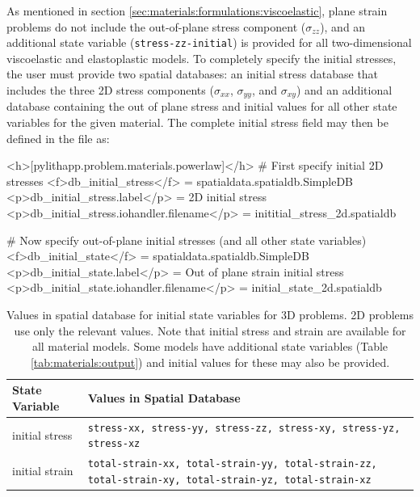 

As mentioned in section \vref{sec:materials:formulations:viscoelastic}, plane
strain problems do not include the out-of-plane stress component ($\sigma_{zz}$),
and an additional state variable (\texttt{stress-zz-initial}) is provided
for all two-dimensional viscoelastic and elastoplastic models. To
completely specify the initial stresses, the user must provide two
spatial databases: an initial stress database that includes the three
2D stress components ($\sigma_{xx}$, $\sigma_{yy}$, and $\sigma_{xy}$)
and an additional database containing the out of plane stress and
initial values for all other state variables for the given material.
The complete initial stress field may then be defined in the 
file as:
\begin{cfg}
<h>[pylithapp.problem.materials.powerlaw]</h>
# First specify initial 2D stresses
<f>db_initial_stress</f> = spatialdata.spatialdb.SimpleDB
<p>db_initial_stress.label</p> = 2D initial stress
<p>db_initial_stress.iohandler.filename</p> = inititial_stress_2d.spatialdb

# Now specify out-of-plane initial stresses (and all other state variables)
<f>db_initial_state</f> = spatialdata.spatialdb.SimpleDB
<p>db_initial_state.label</p> = Out of plane strain initial stress
<p>db_initial_state.iohandler.filename</p> = initial_state_2d.spatialdb
\end{cfg}

\begin{table}[htbp]
\caption{Values in spatial database for initial state variables for 3D
  problems.  2D problems use only the relevant values. Note that
  initial stress and strain are available for all material
  models. Some models have additional state variables (Table
  \vref{tab:materials:output}) and initial values for these may
  also be provided.}
\begin{tabular}{p{0.85in}p{5.0in}}
\textbf{State Variable} & \textbf{Values in Spatial Database}\\
\hline 
initial stress & \texttt{stress-xx, stress-yy, stress-zz, stress-xy, stress-yz, stress-xz}\\
initial strain & \texttt{total-strain-xx, total-strain-yy, total-strain-zz, total-strain-xy,
total-strain-yz, total-strain-xz}\\
\hline 
\end{tabular}
\end{table}


